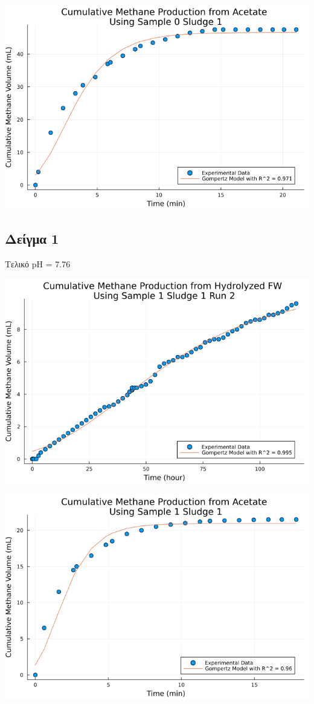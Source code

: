 \documentclass[11pt]{article}
\begin{document}
\begin{center}
\includegraphics[width=.9\linewidth]{../plots/BMPs/Acetate/methane_kinetics_acet_test_0_s1_min.png}
\end{center}

\subsection{Δείγμα 1}
\label{sec:orgbc2ae3d}
Τελικό pH = 7.76

\begin{center}
\includegraphics[width=.9\linewidth]{../plots/BMPs/Hydrolyzed FW/methane_kinetics_hydrolysate_1_s1_r2_hour.png}
\end{center}

\begin{center}
\includegraphics[width=.9\linewidth]{../plots/BMPs/Acetate/methane_kinetics_acet_test_1_s1_min.png}
\end{center}
\end{document}
